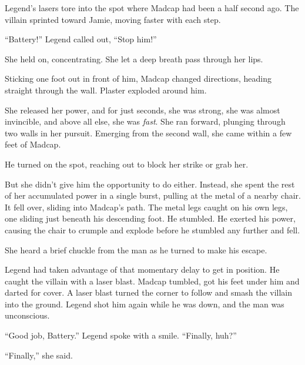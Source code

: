 Legend's lasers tore into the spot where Madcap had been a half second ago.  The villain sprinted toward Jamie, moving faster with each step.



``Battery!'' Legend called out, ``Stop him!''



She held on, concentrating.  She let a deep breath pass through her lips.



Sticking one foot out in front of him, Madcap changed directions, heading straight through the wall.  Plaster exploded around him.



She released her power, and for just seconds, she was strong, she was almost invincible, and above all else, she was \emph{fast}.  She ran forward, plunging through two walls in her pursuit.  Emerging from the second wall, she came within a few feet of Madcap.



He turned on the spot, reaching out to block her strike or grab her.



But she didn't give him the opportunity to do either.  Instead, she spent the rest of her accumulated power in a single burst, pulling at the metal of a nearby chair.  It fell over, sliding into Madcap's path.  The metal legs caught on his own legs, one sliding just beneath his descending foot.  He stumbled.  He exerted his power, causing the chair to crumple and explode before he stumbled any further and fell.\emph{  }



She heard a brief chuckle from the man as he turned to make his escape.



Legend had taken advantage of that momentary delay to get in position.  He caught the villain with a laser blast.  Madcap tumbled, got his feet under him and darted for cover.  A laser blast turned the corner to follow and smash the villain into the ground.  Legend shot him again while he was down, and the man was unconscious.



``Good job, Battery.'' Legend spoke with a smile.  ``Finally, huh?''



``Finally,'' she said.



\sectionbreak



